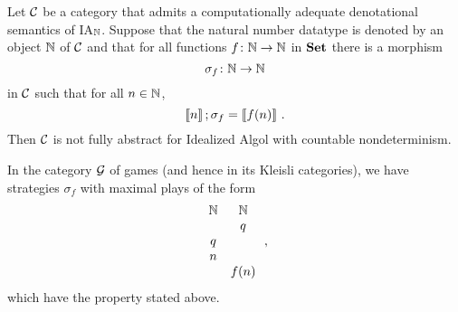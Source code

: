 \documentclass[11pt]{report}
\begin{document}
\begin{proposition}
  Let ${\mathcal{C}}$ be a category that admits a computationally adequate denotational semantics of IA${}_{\mathbb{N}}$.  
  Suppose that the natural number datatype is denoted by an object $\mathbb{N}$ of ${\mathcal{C}}$ and that for all functions $f \colon \mathbb{N} \to \mathbb{N}$ in ${\normalfont\textbf{Set}}$ there is a morphism
  \[
    \sigma_f \colon \mathbb{N} \to \mathbb{N}
    \]
  in ${\mathcal{C}}$ such that for all $n\in \mathbb{N}$, 
  \[
    \left\llbracket n\right\rrbracket;\sigma_f = \left\llbracket f(n)\right\rrbracket\,.
    \]
  Then ${\mathcal{C}}$ is not fully abstract for Idealized Algol with countable nondeterminism.
  \label{PropNotFullyAbstract}
\end{proposition}
\begin{example}
  In the category $\mathcal G$ of games (and hence in its Kleisli categories), we have strategies $\sigma_f$ with maximal plays of the form
  \[
    \begin{array}{cc}
      \mathbb{N} & \mathbb{N} \\
          &  q  \\
       q  &     \\
       n  &     \\
          & f(n)
    \end{array}\,,
    \]
  which have the property stated above.
\end{example}
\end{document}
